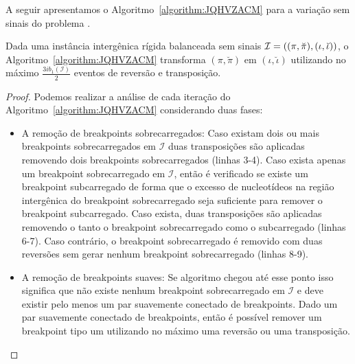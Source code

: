 A seguir apresentamos o Algoritmo~\ref{algorithm:JQHVZACM} para a variação sem sinais do problema \SbIRT{}.



\begin{lemma}\label{lemma:RNJHXOWZ}
Dada uma instância intergênica rígida balanceada sem sinais $\mathcal{I}=((\pi,\breve\pi),\break(\iota,\breve\iota))$, o Algoritmo~\ref{algorithm:JQHVZACM} transforma $(\pi,\breve\pi)$ em $(\iota,\breve\iota)$ utilizando no máximo $\frac{3ib_1(\mathcal{I})}{2}$ eventos de reversão e transposição.
\end{lemma}
\begin{proof}
Podemos realizar a análise de cada iteração do Algoritmo~\ref{algorithm:JQHVZACM} considerando duas fases:
\begin{itemize}
  \item A remoção de breakpoints sobrecarregados: Caso existam dois ou mais breakpoints sobrecarregados em $\mathcal{I}$ duas transposições são aplicadas removendo dois breakpoints sobrecarregados (linhas 3-4). Caso exista apenas um breakpoint sobrecarregado em $\mathcal{I}$, então é verificado se existe um breakpoint subcarregado de forma que o excesso de nucleotídeos na região intergênica do breakpoint sobrecarregado seja suficiente para remover o breakpoint subcarregado. Caso exista, duas transposições são aplicadas removendo o tanto o breakpoint sobrecarregado como o subcarregado (linhas 6-7). Caso contrário, o breakpoint sobrecarregado é removido com duas reversões sem gerar nenhum breakpoint sobrecarregado (linhas 8-9).
  \item A remoção de breakpoints suaves: Se algoritmo chegou até esse ponto isso significa que não existe nenhum breakpoint sobrecarregado em $\mathcal{I}$ e deve existir pelo menos um par suavemente conectado de breakpoints. Dado um par suavemente conectado de breakpoints, então é possível remover um breakpoint tipo um utilizando no máximo uma reversão ou uma transposição.
\end{itemize}

\end{proof}
